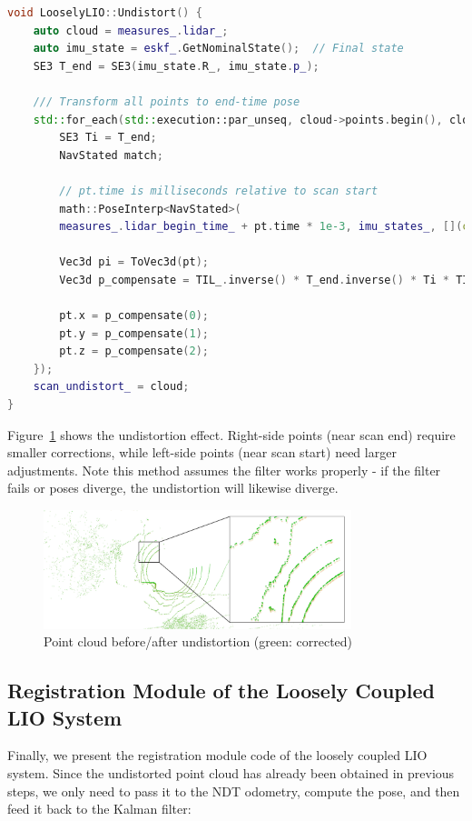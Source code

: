 \begin{lstlisting}[language=c++,caption=src/ch7/loosely_coupled_lio/loosly_lio.cc]
void LooselyLIO::Undistort() {
	auto cloud = measures_.lidar_;
	auto imu_state = eskf_.GetNominalState();  // Final state
	SE3 T_end = SE3(imu_state.R_, imu_state.p_);
	
	/// Transform all points to end-time pose
	std::for_each(std::execution::par_unseq, cloud->points.begin(), cloud->points.end(), [&](auto &pt) {
		SE3 Ti = T_end;
		NavStated match;
		
		// pt.time is milliseconds relative to scan start
		math::PoseInterp<NavStated>(
		measures_.lidar_begin_time_ + pt.time * 1e-3, imu_states_, [](const NavStated &s) { return s.timestamp_; }, [](const NavStated &s) { return s.GetSE3(); }, Ti, match);
		
		Vec3d pi = ToVec3d(pt);
		Vec3d p_compensate = TIL_.inverse() * T_end.inverse() * Ti * TIL_ * pi;
		
		pt.x = p_compensate(0);
		pt.y = p_compensate(1);
		pt.z = p_compensate(2);
	});
	scan_undistort_ = cloud;
}
\end{lstlisting}

Figure~\ref{fig:cloud-undist} shows the undistortion effect. Right-side points (near scan end) require smaller corrections, while left-side points (near scan start) need larger adjustments. Note this method assumes the filter works properly - if the filter fails or poses diverge, the undistortion will likewise diverge.

\begin{figure}[!t]
	\centering
	\includegraphics[width=0.8\textwidth]{resources/3d-lidar-mapping/cloud_undist}
	\caption{Point cloud before/after undistortion (green: corrected)}
	\label{fig:cloud-undist}
\end{figure}

\subsection{Registration Module of the Loosely Coupled LIO System}
Finally, we present the registration module code of the loosely coupled LIO system. Since the undistorted point cloud has already been obtained in previous steps, we only need to pass it to the NDT odometry, compute the pose, and then feed it back to the Kalman filter:

